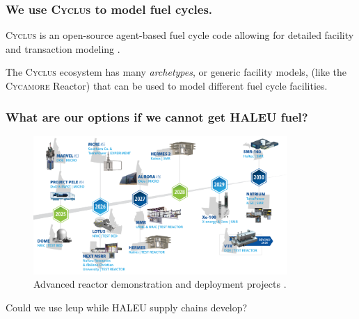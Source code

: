 \documentclass[9pt]{beamer}
\newcommand{\cycamore}{\textsc{Cycamore}\xspace}
\newcommand{\cyclus}{\textsc{Cyclus}\xspace}
\begin{document}
\begin{frame}
  \frametitle{We use \cyclus to model fuel cycles.}
  \vspace{10pt}
  \cyclus is an open-source agent-based fuel cycle code allowing for detailed facility and transaction modeling \cite{huff_fundamental_2016}.
  \begin{center}
  \end{center} %

  The \cyclus ecosystem has many \textit{archetypes}, or generic facility models, (like the \cycamore Reactor) that can be used to model different fuel cycle facilities.
  \end{frame}

  \begin{frame}
    \frametitle{What are our options if we cannot get HALEU fuel?}
    \begin{figure}
        \centering
        \includegraphics[width=0.86\textwidth]{../images/reactor_timeline.png}
        \caption{Advanced reactor demonstration and deployment projects \cite{inl_reactor_timeline}.}
    \end{figure}
    Could we use \gls{leup} while HALEU supply chains develop?
  \end{frame}
\end{document}
